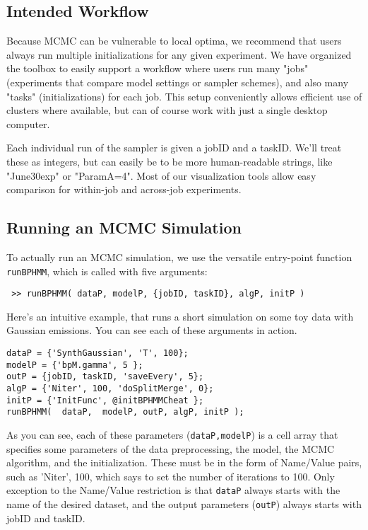 \documentclass[fontsize=12]{article}
\begin{document}
\subsection{ Intended Workflow }
Because MCMC can be vulnerable to local optima, we recommend that users always run multiple initializations for any given experiment.  We have organized the toolbox to easily support a workflow where users run many "jobs" (experiments that compare model settings or sampler schemes), and also many "tasks" (initializations) for each job.  This setup conveniently allows efficient use of clusters where available, but can of course work with just a single desktop computer.

Each individual run of the sampler is given a jobID and a taskID.  We'll treat these as integers, but can easily be to be more human-readable strings, like "June30exp" or "ParamA=4".  Most of our visualization tools allow easy comparison for within-job and across-job experiments.

\subsection{ Running an MCMC Simulation }
To actually run an MCMC simulation, we use the versatile entry-point function \texttt{runBPHMM}, which is called with five arguments:

\texttt{ >> runBPHMM(  dataP,  modelP, \{jobID, taskID\}, algP, initP ) }

Here's an intuitive example, that runs a short simulation on some toy data with Gaussian emissions.  You can see each of these arguments in action.

\begin{verbatim}
dataP = {'SynthGaussian', 'T', 100};
modelP = {'bpM.gamma', 5 };
outP = {jobID, taskID, 'saveEvery', 5};
algP = {'Niter', 100, 'doSplitMerge', 0};
initP = {'InitFunc', @initBPHMMCheat };
runBPHMM(  dataP,  modelP, outP, algP, initP );
\end{verbatim}

As you can see, each of these parameters (\texttt{dataP,modelP}) is a cell array that specifies some parameters of the data preprocessing, the model, the MCMC algorithm, and the initialization.  These must be in the form of Name/Value pairs, such as {'Niter', 100}, which says to set the number of iterations to 100. Only exception to the Name/Value restriction is that \texttt{dataP} always starts with the name of the desired dataset, and the output parameters (\texttt{outP}) always starts with jobID and taskID.
\end{document}
